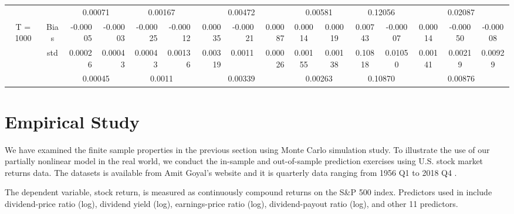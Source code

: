 \documentclass[a4paper,12pt,times,numbered,print,index]{report}
\numberwithin{equation}{section}
\begin{document}
\begin{table}[htbp]
\begin{adjustbox}{max width=\textwidth}
\begin{tabular}{cccccccccccccccc}
		&       & \multicolumn{2}{c}{0.00071} & \multicolumn{2}{c}{0.00167} & \multicolumn{3}{c}{0.00472} & \multicolumn{2}{c}{0.00581} & \multicolumn{2}{c}{0.12056} & \multicolumn{3}{c}{0.02087} \\
		\multirow{3}[1]{*}{T = 1000} & Bias  & \multicolumn{1}{r}{\textcolor[rgb]{ 0,  .439,  .753}{-0.00005}} & \multicolumn{1}{r}{-0.00003} & \multicolumn{1}{r}{-0.00025} & \multicolumn{1}{r}{-0.00012} & \multicolumn{1}{r}{0.00035} & \multicolumn{1}{r}{-0.00021} & \multicolumn{1}{r}{0.00087} & \textcolor[rgb]{ 0,  .439,  .753}{0.00014} & 0.00019 & 0.00743 & -0.00007 & 0.00014 & -0.00050 & -0.00008 \\
		& std   & \multicolumn{1}{r}{0.00026} & \multicolumn{1}{r}{0.00043} & \multicolumn{1}{r}{0.00043} & \multicolumn{1}{r}{0.00136} & \multicolumn{1}{r}{0.00319} & \multicolumn{1}{r}{0.0011} & \multicolumn{1}{r}{0.00026} & 0.00155 & 0.00138 & 0.10818 & 0.01050 & 0.00141 & 0.00219 & 0.00929 \\
		&       & \multicolumn{2}{c}{0.00045} & \multicolumn{2}{c}{0.0011} & \multicolumn{3}{c}{0.00339} & \multicolumn{2}{c}{0.00263} & \multicolumn{2}{c}{0.10870} & \multicolumn{3}{c}{0.00876} \\
		\bottomrule
		\bottomrule
    \end{tabular}%
	\end{adjustbox}
	\label{co-non}%
\end{table}%



\section{Empirical Study}
We have examined the finite sample properties in the previous section using Monte Carlo simulation study. To illustrate the use of our partially nonlinear model in the real world, we conduct the in-sample and out-of-sample prediction exercises using U.S. stock market returns data.
The datasets is available from Amit Goyal's website and it is quarterly data ranging from 1956 Q1 to 2018 Q4 . 

The dependent variable, stock return, is measured as continuously compound returns on the S\&P 500 index. 
Predictors used in \cite{welch2008comprehensive} include dividend-price ratio (log), dividend yield (log), earnings-price ratio (log), dividend-payout ratio (log), and other 11 predictors. 
\end{document}
